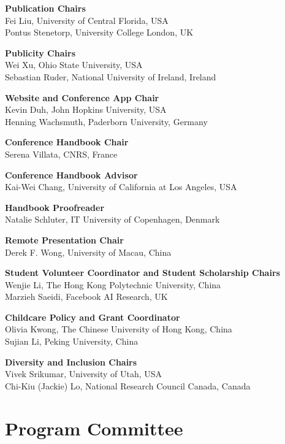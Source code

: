 {\bf Publication Chairs} \\
Fei Liu, University of Central Florida, USA \\
Pontus Stenetorp, University College London, UK


{\bf Publicity Chairs}\\
Wei Xu, Ohio State University, USA \\
Sebastian Ruder, National University of Ireland, Ireland


{\bf Website and Conference App Chair}\\
Kevin Duh, John Hopkins University, USA \\
Henning Wachsmuth, Paderborn University, Germany


{\bf Conference Handbook Chair}\\
Serena Villata, CNRS, France


{\bf Conference Handbook Advisor}\\
Kai-Wei Chang, University of California at Los Angeles, USA


{\bf Handbook Proofreader}\\
Natalie Schluter, IT University of Copenhagen, Denmark


{\bf Remote Presentation Chair}\\
Derek F. Wong, University of Macau, China


{\bf Student Volunteer Coordinator and Student Scholarship Chairs}\\
Wenjie Li, The Hong Kong Polytechnic University, China \\
Marzieh Saeidi, Facebook AI Research, UK  

\newpage
{\bf Childcare Policy and Grant Coordinator}\\
Olivia Kwong, The Chinese University of Hong Kong, China \\
Sujian Li, Peking University, China


{\bf Diversity and Inclusion Chairs}\\
Vivek Srikumar, University of Utah, USA \\
Chi-Kiu (Jackie) Lo, National Research Council Canada, Canada


\clearpage
\section{Program Committee}
\setlength{\parindent}{0pt}

